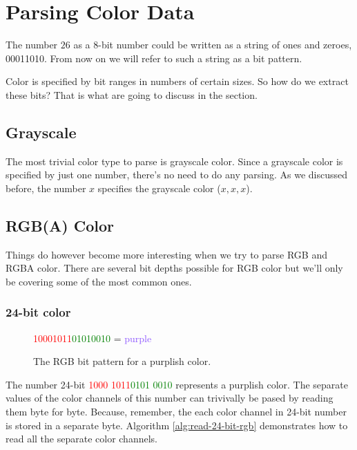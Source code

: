   \section{Parsing Color Data}
  \label{sec:parsing-color-data}

  The number $26$ as a 8-bit number could be written as a string of
  ones and zeroes, 00011010. From now on we will refer to such a
  string as a bit pattern.

  Color is specified by bit ranges in numbers of certain
  sizes. So how do we extract these bits? That is what are going to
  discuss in the section.

  \subsection{Grayscale}

  The most trivial color type to parse is grayscale color. Since a
  grayscale color is specified by just one number, there's no need to
  do any parsing. As we discussed before, the number $x$ specifies the
  grayscale color \mbox{($x,x,x$)}. 

  \subsection{RGB(A) Color}

  Things do however become more interesting when we try to parse RGB
  and RGBA color. There are several bit depths possible for RGB
  color but we'll only be covering some of the most common ones.

  \subsubsection{24-bit color}

  \begin{figure}
    \centering
    {\huge\textcolor{red}{10001011}\textcolor{green}{01010010}\textcolor{blue}{\fullbyte}
    = \textcolor[HTML]{8B52FF}{purple}}
    \caption{The RGB bit pattern for a purplish color.}
    \label{fig:24-bit-colors-bits}
  \end{figure}

  The number 24-bit \textcolor{red}{1000 1011}\textcolor{green}{0101
    0010}\textcolor{blue}{\fullbyte} represents a purplish color. The
  separate values of the color channels of this number can trivivally
  be pased by reading them byte for byte. Because, remember, the each
  color channel in 24-bit number is stored in a separate
  byte. Algorithm \ref{alg:read-24-bit-rgb} demonstrates how to read
  all the separate color channels.

